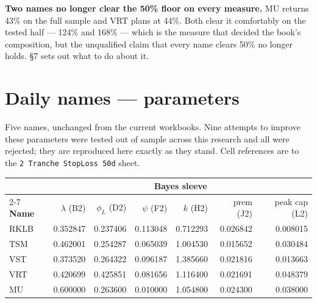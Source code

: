 \documentclass[11pt]{article}
\begin{document}
\textbf{Two names no longer clear the 50\% floor on every measure.} MU returns 43\% on the full
sample and VRT plans at 44\%. Both clear it comfortably on the tested half --- 124\% and 168\% ---
which is the measure that decided the book's composition, but the unqualified claim that every
name clears 50\% no longer holds. \S7 sets out what to do about it.

\section{Daily names --- parameters}

Five names, unchanged from the current workbooks. Nine attempts to improve these parameters were
tested out of sample across this research and all were rejected; they are reproduced here exactly
as they stand. Cell references are to the \texttt{2 Tranche StopLoss 50d} sheet.

\begin{table}[H]\centering\footnotesize
\setlength{\tabcolsep}{4pt}
\begin{tabular}{lrrrrrr}
\toprule
& \multicolumn{6}{c}{\textbf{Bayes sleeve}}\\
\cmidrule(l){2-7}
\textbf{Name} & $\lambda$ (B2) & $\phi_L$ (D2) & $\psi$ (F2) & $k$ (H2) & prem (J2) &
peak cap (L2)\\
\midrule
\rowcolor{bckeep} RKLB & 0.352847 & 0.237406 & 0.113048 & 0.712293 & 0.026842 & 0.008015\\
TSM  & 0.462001 & 0.254287 & 0.065039 & 1.004530 & 0.015652 & 0.030484\\
\rowcolor{bckeep} VST  & 0.373520 & 0.264322 & 0.096187 & 1.385660 & 0.021816 & 0.013663\\
VRT  & 0.420699 & 0.425851 & 0.081656 & 1.116400 & 0.021691 & 0.048379\\
\rowcolor{bckeep} MU   & 0.600000 & 0.263600 & 0.010000 & 1.054800 & 0.024300 & 0.038000\\
\bottomrule
\end{tabular}
\end{table}
\end{document}
